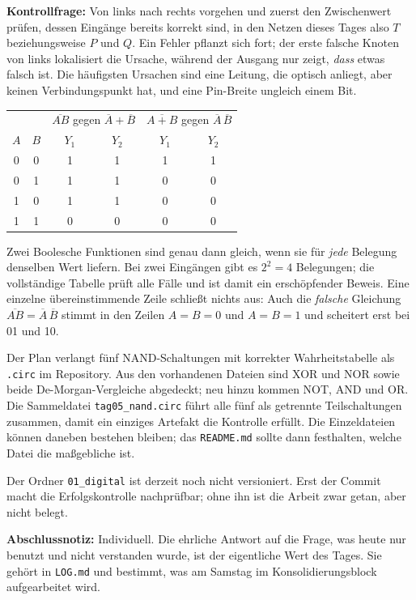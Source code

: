 \documentclass[10pt,a4paper]{article}
\newcommand{\block}[1]{\par\vspace{2mm}{\sffamily\large\bfseries #1}\par}
\newcommand{\code}[1]{\texttt{#1}}
\begin{document}
\textbf{Kontrollfrage:} Von links nach rechts vorgehen und zuerst den
Zwischenwert prüfen, dessen Eingänge bereits korrekt sind, in den Netzen dieses
Tages also $T$ beziehungsweise $P$ und $Q$. Ein Fehler pflanzt sich fort; der
erste falsche Knoten von links lokalisiert die Ursache, während der Ausgang nur
zeigt, \emph{dass} etwas falsch ist. Die häufigsten Ursachen sind eine Leitung,
die optisch anliegt, aber keinen Verbindungspunkt hat, und eine Pin-Breite
ungleich einem Bit.

\block{9. Die beiden De-Morgan-Nachweise}
\begin{center}
\begin{tabular}{cc|cc|cc}\toprule
&&\multicolumn{2}{c|}{$\overline{AB}$ gegen $\overline{A}+\overline{B}$}&\multicolumn{2}{c}{$\overline{A+B}$ gegen $\overline{A}\,\overline{B}$}\\
$A$&$B$&$Y_1$&$Y_2$&$Y_1$&$Y_2$\\\midrule
0&0&1&1&1&1\\
0&1&1&1&0&0\\
1&0&1&1&0&0\\
1&1&0&0&0&0\\\bottomrule
\end{tabular}
\end{center}
Zwei Boolesche Funktionen sind genau dann gleich, wenn sie für \emph{jede}
Belegung denselben Wert liefern. Bei zwei Eingängen gibt es $2^2=4$ Belegungen;
die vollständige Tabelle prüft alle Fälle und ist damit ein erschöpfender
Beweis. Eine einzelne übereinstimmende Zeile schließt nichts aus: Auch die
\emph{falsche} Gleichung $\overline{AB}=\overline{A}\,\overline{B}$ stimmt in
den Zeilen $A=B=0$ und $A=B=1$ und scheitert erst bei 01 und 10.

\block{10. Erfolgskontrolle}
Der Plan verlangt fünf NAND-Schaltungen mit korrekter Wahrheitstabelle als
\code{.circ} im Repository. Aus den vorhandenen Dateien sind XOR und NOR sowie
beide De-Morgan-Vergleiche abgedeckt; neu hinzu kommen NOT, AND und OR. Die
Sammeldatei \code{tag05\_nand.circ} führt alle fünf als getrennte
Teilschaltungen zusammen, damit ein einziges Artefakt die Kontrolle erfüllt.
Die Einzeldateien können daneben bestehen bleiben; das \code{README.md} sollte
dann festhalten, welche Datei die maßgebliche ist.

Der Ordner \code{01\_digital} ist derzeit noch nicht versioniert. Erst der
Commit macht die Erfolgskontrolle nachprüfbar; ohne ihn ist die Arbeit zwar
getan, aber nicht belegt.

\textbf{Abschlussnotiz:} Individuell. Die ehrliche Antwort auf die Frage, was
heute nur benutzt und nicht verstanden wurde, ist der eigentliche Wert des
Tages. Sie gehört in \code{LOG.md} und bestimmt, was am Samstag im
Konsolidierungsblock aufgearbeitet wird.
\end{document}
